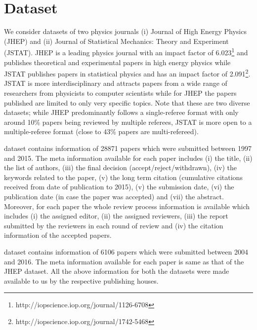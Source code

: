 \noindent
\section{Dataset}
\label{dataset}
We consider datasets of two physics journals (i) Journal of High Energy Physics (JHEP) and 
(ii) Journal of Statistical Mechanics: Theory and Experiment (JSTAT). JHEP is a leading physics 
journal with an impact factor of 6.023\footnote{http://iopscience.iop.org/journal/1126-6708} and 
publishes theoretical and experimental papers in high energy physics while JSTAT publishes papers in statistical physics and has 
an impact factor of 2.091\footnote{http://iopscience.iop.org/journal/1742-5468}. 
JSTAT is more interdisciplinary and attracts papers from a wide range of researchers from physicists to computer scientists while for JHEP the papers published are 
limited to only very specific topics. 
Note that these are two diverse datasets; while JHEP predominantly follows a single-referee format with only around 10\% papers being reviewed by multiple referees, 
JSTAT is more open to a multiple-referee format (close to 43\% papers are multi-refereed). 

 dataset contains information of 28871 papers which were submitted between 1997 and 2015. The meta information available for each paper includes 
(i) the title, (ii) the list of authors, (iii) the final decision (accept/reject/withdrawn), (iv) the keywords related to the paper, (v) the long term citation 
(cumulative citations received 
from date of publication to 2015), (v) the submission date, (vi) the publication date (in case the paper was accepted) and (vii) the abstract. 
Moreover, for each paper the whole review process information is available which includes (i) the assigned editor, (ii) the assigned reviewers, (iii) the report submitted 
by the reviewers in each round of review and (iv) the citation information of the accepted papers.

 dataset contains information of 6106 papers which were submitted between 2004 and 2016. The meta information available for each paper is same as that of the 
JHEP dataset. 
All the above information for both the datasets were made available to us by the respective publishing houses.

